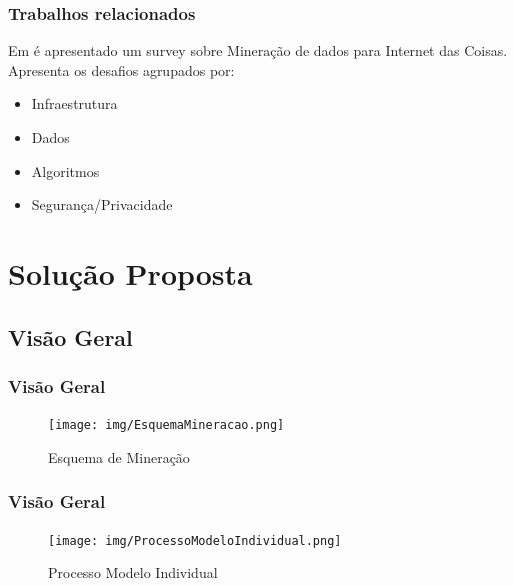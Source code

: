 \documentclass[hyperref={pdfpagelabels=false}]{beamer}
\begin{document}
\begin{frame}
	\frametitle{Trabalhos relacionados}


    Em \cite{000-000} é apresentado um survey sobre Mineração de dados para Internet das Coisas. \\
    Apresenta os desafios agrupados por:
	\begin{itemize}
		\item Infraestrutura
        \item Dados
        \item Algoritmos
        \item Segurança/Privacidade
	\end{itemize}

\end{frame}

\section{Solução Proposta}

\subsection{Visão Geral}  

\begin{frame}
	\frametitle{Visão Geral}
    \begin{figure}
		\centering
	    \texttt{[image: img/EsquemaMineracao.png]}
  		\caption{\scriptsize{Esquema de Mineração}}
   	\end{figure}


\end{frame}

\begin{frame}
	\frametitle{Visão Geral}
    \begin{figure}
		\centering
	    \texttt{[image: img/ProcessoModeloIndividual.png]}
  		\caption{\scriptsize{Processo Modelo Individual}}
   	\end{figure}

\end{frame}
\end{document}
